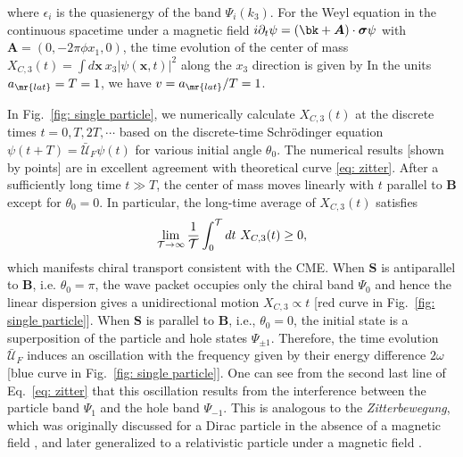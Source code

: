 \documentclass[
floatfix,
pra,
twocolumn,
reprint,
amsmath,amssymb,
aps,
footnote,
]{revtex4}
\begin{document}
where $\epsilon_i$ is the quasienergy of the band $\Psi_i(k_3)$.
For the Weyl equation in the continuous spacetime under a magnetic field $i \partial_t \psi = (\bk + \bm{A})\cdot \bm{\sigma} \psi$ with $\bm{A} = (0, - 2 \pi \phi x_1, 0)$, the time evolution of the center of mass $X_{C, 3}(t) = \int d\bm{x} \ x_3 |\psi(\bm{x}, t)|^2$ along the $x_3$ direction is given by
In the units $a_{\mr{lat}} = T = 1$, we have $v = a_{\mr{lat}}/T = 1$.




In Fig.~\ref{fig: single particle}, we numerically calculate $X_{C, 3}(t)$ at the discrete times $t = 0, T, 2T, \cdots$ based on the discrete-time Schr\"odinger equation $\psi(t + T) = \bar{\mathcal{U}}_F \psi(t)$ for various initial angle $\theta_0$.
The numerical results [shown by points] are in excellent agreement with theoretical curve \eqref{eq: zitter}.
After a sufficiently long time $t \gg T$, the center of mass moves linearly with $t$ parallel to $\bm{B}$ except for $\theta_0 = 0$.
In particular, the long-time average of $X_{C, 3}(t)$ satisfies
\begin{align}
	\lim_{\mathcal{T} \to \infty}
	{1 \over \mathcal{T}}
	\int_0^{\mathcal{T}} dt \ X_{C, 3}(t) \ge 0
	,
\end{align}
which manifests chiral transport consistent with the CME.
When $\bm{S}$ is antiparallel to $\bm{B}$, i.e. $\theta_0 = \pi$, the wave packet occupies only the chiral band $\Psi_0$ and hence the linear dispersion gives a unidirectional motion $X_{C, 3} \propto t$ [red curve in Fig.~\ref{fig: single particle}].
When $\bm{S}$ is parallel to $\bm{B}$, i.e., $\theta_0 = 0$, the initial state is a superposition of the particle and hole states $\Psi_{\pm 1}$.
Therefore, the time evolution $\bar{\mathcal{U}}_F$ induces an oscillation with the frequency given by their energy difference $2\omega$ [blue curve in Fig.~\ref{fig: single particle}].
One can see from the second last line of Eq.~\eqref{eq: zitter} that this oscillation results from the interference between the particle band $\Psi_1$ and the hole band $\Psi_{-1}$.
This is analogous to the \textit{Zitterbewegung}, which was originally discussed for a Dirac particle in the absence of a magnetic field \cite{SchrodingerE30}, and later generalized to a relativistic particle under a magnetic field \cite{BermudezA07, RusinT10}.
\end{document}
